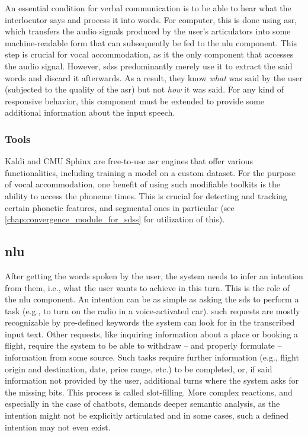 An essential condition for verbal communication is to be able to hear what the interlocutor says and process it into words.
For computer, this is done using \acf{asr}, which transfers the audio signals produced by the user's articulators into some machine-readable form that can subsequently be fed to the \ac{nlu} component.
This step is crucial for vocal accommodation, as it the only component that accesses the audio signal.
However, \acp{sds} predominantly merely use it to extract the said words and discard it afterwards.
As a result, they know \emph{what} was said by the user (subjected to the quality of the \ac{asr}) but not \emph{how} it was said.
For any kind of responsive behavior, this component must be extended to provide some additional information about the input speech.

\subsubsection{Tools}
\label{subsubsec:tools_asr}

Kaldi \citep{Povey2011kaldi} and CMU Sphinx \citep{Lamere2003sphinx} are free-to-use \ac{asr} engines that offer various functionalities, including training a model on a custom dataset.
For the purpose of vocal accommodation, one benefit of using such modifiable toolkits is the ability to access the phoneme times.
This is crucial for detecting and tracking certain phonetic features, and segmental ones in particular (see \cref{chap:convergence_module_for_sdss} for utilization of this).

\subsection{\Acl{nlu}}
\label{subsec:natural_language_understanding}

After getting the words spoken by the user, the system needs to infer an intention from them, i.e., what the user wants to achieve in this turn.
This is the role of the \acf{nlu} component.
An intention can be as simple as asking the \ac{sds} to perform a task (e.g., to turn on the radio in a voice-activated car).
such requests are mostly recognizable by pre-defined keywords the system can look for in the transcribed input text.
Other requests, like inquiring information about a place or booking a flight, require the system to be able to withdraw -- and properly formulate -- information from some source.
Such tasks require further information (e.g., flight origin and destination, date, price range, etc.) to be completed, or, if said information not provided by the user, additional turns where the system asks for the missing bits.
This process is called slot-filling.
More complex reactions, and especially in the case of chatbots, demands deeper semantic analysis, as the intention might not be explicitly articulated and in some cases, such a defined intention may not even exist.

